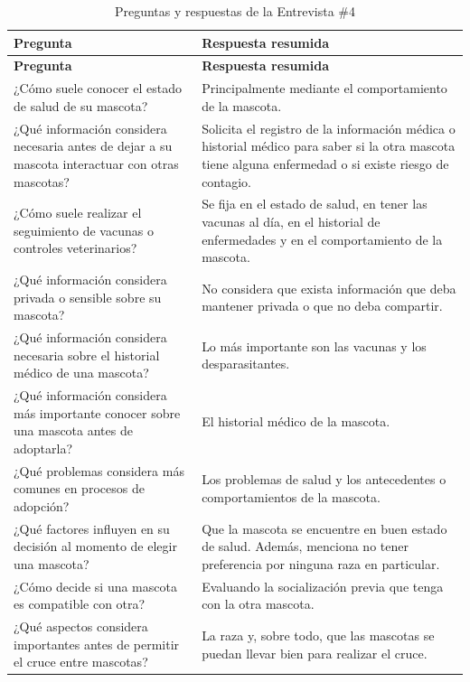 \documentclass[journal,onecolumn]{IEEEtran}
\begin{document}
\begin{longtable}{|p{7.5cm}|p{7.5cm}|}
\caption{Preguntas y respuestas de la Entrevista \#4}
\label{tab:pr_e4}\\
\hline
\textbf{Pregunta} & \textbf{Respuesta resumida} \\
\hline
\endfirsthead
\hline
\textbf{Pregunta} & \textbf{Respuesta resumida} \\
\hline
\endhead
¿Cómo suele conocer el estado de salud de su mascota? & Principalmente mediante el comportamiento de la mascota. \\
\hline
¿Qué información considera necesaria antes de dejar a su mascota interactuar con otras mascotas? & Solicita el registro de la información médica o historial médico para saber si la otra mascota tiene alguna enfermedad o si existe riesgo de contagio. \\
\hline
¿Cómo suele realizar el seguimiento de vacunas o controles veterinarios? & Se fija en el estado de salud, en tener las vacunas al día, en el historial de enfermedades y en el comportamiento de la mascota. \\
\hline
¿Qué información considera privada o sensible sobre su mascota? & No considera que exista información que deba mantener privada o que no deba compartir. \\
\hline
¿Qué información considera necesaria sobre el historial médico de una mascota? & Lo más importante son las vacunas y los desparasitantes. \\
\hline
¿Qué información considera más importante conocer sobre una mascota antes de adoptarla? & El historial médico de la mascota. \\
\hline
¿Qué problemas considera más comunes en procesos de adopción? & Los problemas de salud y los antecedentes o comportamientos de la mascota. \\
\hline
¿Qué factores influyen en su decisión al momento de elegir una mascota? & Que la mascota se encuentre en buen estado de salud. Además, menciona no tener preferencia por ninguna raza en particular. \\
\hline
¿Cómo decide si una mascota es compatible con otra? & Evaluando la socialización previa que tenga con la otra mascota. \\
\hline
¿Qué aspectos considera importantes antes de permitir el cruce entre mascotas? & La raza y, sobre todo, que las mascotas se puedan llevar bien para realizar el cruce. \\
\hline
\end{longtable}
\end{document}
